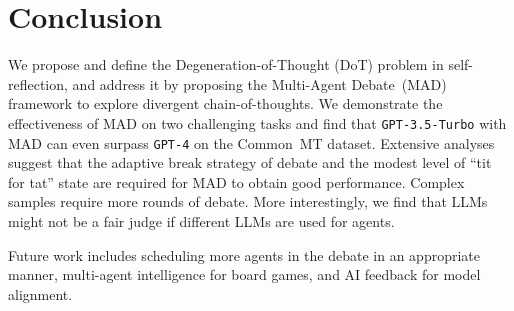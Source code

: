 \section{Conclusion}

We propose and define the Degeneration-of-Thought (DoT) problem in self-reflection, and address it by proposing the Multi-Agent Debate~(MAD) framework to explore divergent chain-of-thoughts.
We demonstrate the effectiveness of MAD on two challenging tasks and find that \texttt{GPT-3.5-Turbo} with MAD can even surpass \texttt{GPT-4} on the Common~MT dataset.
Extensive analyses suggest that the adaptive break strategy of debate and the modest level of ``tit for tat'' state are required for MAD to obtain good performance. 
Complex samples require more rounds of debate.
More interestingly, we find that LLMs might not be a fair judge if different LLMs are used for agents. 

Future work includes scheduling more agents in the debate in an appropriate manner, multi-agent intelligence for board games, and AI feedback for model alignment.

